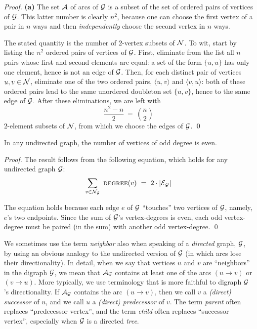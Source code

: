 \begin{proof}
{\bf (a)}
The set $\mbox{$\cal A$}$ of arcs of $\mbox{$\cal G$}$ is a subset of the set of ordered pairs of vertices of $\mbox{$\cal G$}$.  This latter number is clearly $n^2$, because one can choose the first vertex of a pair in $n$ ways and then
{\em independently} choose the second vertex in $n$ ways.

\medskip

The stated quantity is the number of $2$-vertex subsets of $\mbox{$\cal N$}$.  To wit, start by listing the $n^2$ ordered pairs of vertices of $\mbox{$\cal G$}$.  First, eliminate from the list all $n$ pairs whose first and second elements are equal: a set of the form $\{ u,u\}$ has only one element, hence is not an edge of $\mbox{$\cal G$}$.  Then, for each distinct pair of vertices $u, v \in \mbox{$\cal N$}$, eliminate one of the two ordered pairs, $\langle u,v \rangle$ and $\langle v,u \rangle$: both of these ordered pairs lead to the same unordered doubleton set $\{ u,v\}$, hence to the same edge of $\mbox{$\cal G$}$.  After these eliminations, we are left with
\[ \frac{n^2 - n}{2} \ = \ {n \choose 2} \]
$2$-element subsets of $\mbox{$\cal N$}$, from which we choose the edges of $\mbox{$\cal G$}$. \qed
\end{proof}

\smallskip

\begin{prop}
\label{thm:even-num-odd-degrees}
In any undirected graph, the number of vertices of odd degree is even.
\end{prop}

\begin{proof}
The result follows from the following equation, which holds for any undirected graph $\mbox{$\cal G$}$:
\[ \sum_{v \in {\cal N}_{\cal G}} \ \mbox{\sc degree}(v) \ = \ 2 \cdot |\mbox{$\cal E$}_{\cal G}| \]

The equation holds because each edge $e$ of $\mbox{$\cal G$}$ ``touches'' two vertices of $\mbox{$\cal G$}$, namely, $e$'s two endpoints.  Since the sum of $\mbox{$\cal G$}$'s vertex-degrees is even, each odd vertex-degree must be paired (in the sum) with another odd vertex-degree.  \qed
\end{proof}

\medskip


We sometimes use the term {\it neighbor} also when speaking of a {\em directed} graph, $\mbox{$\cal G$}$, by using an obvious analogy to the undirected version of $\mbox{$\cal G$}$ (in which arcs lose their directionality).  In detail, when we say that vertices $u$ and $v$ are ``neighbors'' in the digraph $\mbox{$\cal G$}$, we mean that $\mbox{$\cal A$}_{\mbox{{\scriptsize $\cal G$}}}$ contains at least one of the arcs $(u \rightarrow v)$ or $(v \rightarrow u)$.  More typically, we use terminology that is more faithful to digraph $\mbox{$\cal G$}$'s 
directionality.  If $\mbox{$\cal A$}_{\mbox{{\scriptsize $\cal G$}}}$ contains the arc $(u \rightarrow v)$, then we call $v$ a {\it (direct) successor} of $u$, and we call $u$ a {\it (direct) predecessor} of $v$.  The term {\it parent} often replaces ``predecessor vertex'', and the term {\it child} often replaces ``successor vertex'', especially when $\mbox{$\cal G$}$ is a directed {\em tree}.

